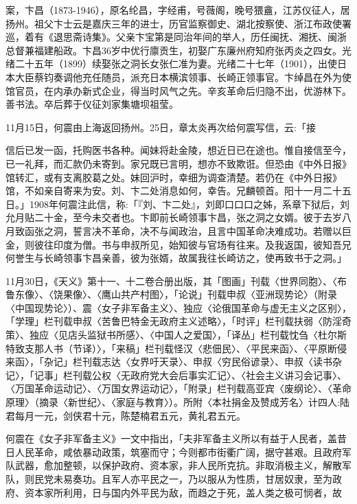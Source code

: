 案，卞昌（1873-1946），原名纶昌，字经甫，号薇阁，晚号猥盦，江苏仪征人，居扬州。祖父卞士云是嘉庆三年的进士，历官监察御史、湖北按察使、浙江布政使署巡，着有《退思斋诗集》。父亲卞宝第是同治年间的举人，历任闽抚、湘抚、闽浙总督兼福建船政。卞昌36岁中优行廪贡生，初娶广东廉州府知府张丙炎之四女。光绪二十五年（1899）续娶张之洞长女张仁准为妻。光绪二十七年（1901），出使日本大臣蔡钧奏调他充任随员，派充日本横滨领事、长崎正领事官。卞绰昌在外为使馆官员，在内承办新式企业，得当时风气之先。辛亥革命后归隐不出，优游林下。善书法。卒后葬于仪征刘家集塘坝祖莹。

11月15日，何震由上海返回扬州。25日，章太炎再次给何震写信，云:「接


\noindent 信后已发一函，托购医书各种。闻妹将赴金陵，想近日已在途也。惟自接信至今，已一礼拜，而汇款仍未寄到。家兄既已言明，想亦不致欺诳。但恐由《中外日报》馆转汇，或有支离胶葛之处。妹回沪时，幸细为调查清楚。若仍在《中外日报》馆，不如亲自寄来为安。刘、卞二处消息如何，幸告。兄麟顿首。阳十一月二十五日。」1908年何震注此信，称:「『刘、卞二处』，刘即口口口之姊，系章下狱后，刘允月贴二十金，至今未交者也。卞即前长崎领事卞昌，张之洞之女婿。彼于去岁八月致函张之洞，誓言决不革命，决不与闻政治，且言中国革命决难成功。若赠以巨金，则彼往印度为僧。书与申叔所见，始知彼与官场有往来。及我返国，彼知吾兄何誉生与长崎领事卞昌亲善，彼为张婿，故属我往长崎访之，使再致书于之洞。」

11月30日，《天义》第十一、十二卷合册出版，其「图画」刊载〈世界同胞〉、〈布鲁东像〉、〈饶果像〉、〈鹰山共产村图〉，「论说」刊载申叔〈亚洲现势论〉（附录〈中国现势论〉）、震〈女子非军备主义〉、独应〈论俄国革命与虚无主义之区别〉，「学理」栏刊载申叔〈苦鲁巴特金无政府主义述略〉，「时评」栏刊载扶弱〈防淫奇策〉、独应〈见店头监狱书所感〉、〈中国人之爱国〉，「译丛」栏刊载忱刍〈杜尔斯特致支那人书（节译）〉，「来稿」栏刊载怪汉〈悲佃民〉、〈平民来函〉、〈平原断侵来函〉，「杂记」栏刊载志达〈女界吁天录〉、申叔〈穷民俗谚录〉、申叔〈读书杂记〉，「记事」栏刊载公权〈无政府党大会后事实汇记〉、〈社会主义讲习会记事〉、〈万国革命运动记〉、〈万国女界运动记〉，「附录」栏刊载高亚宾〈废纲论〉、〈革命原理〉（摘录〈新世纪〉、〈家庭与教育〉）。所附〈本社捐金及赞成芳名〉计四人:陆君每月一元，剑侠君十元，陈楚楠君五元，黄礼君五元。

何震在《女子非军备主义》一文中指出，「夫非军备主义所以有益于人民者，盖昔日人民革命，咸依暴动政策，筑塞而守；今则都市街衢广阔，据守甚艰。且政府军队武器，愈加整顿，以保护政府、资本家，非人民所克抗。非取消极主义，解散军队，则民党未易奏功。且军人亦平民之一，乃以服从为性质，甘居奴隶，至为政府、资本家所利用，日与国内外平民为敌，而趋之于死，盖人类之极可悯者，故


